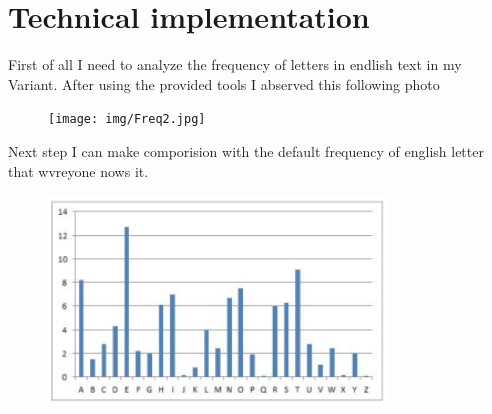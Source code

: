 \documentclass[12pt]{article}
\begin{document}
\section*{Technical implementation}
\hspace{0.8cm}
First of all I need to analyze the frequency of letters in endlish text in my Variant. After using the provided tools I abserved this following photo
\begin{figure}[h!]
    \centering
    \texttt{[image: img/Freq2.jpg]}
    \label{fig:result1}
\end{figure}

Next step I can make comporision with the default frequency of english letter that wvreyone nows it. 

\begin{figure}[h!]
    \centering
    \includegraphics[width=0.8\textwidth]{img/def.png}
    \label{fig:result1}
\end{figure}
\end{document}
